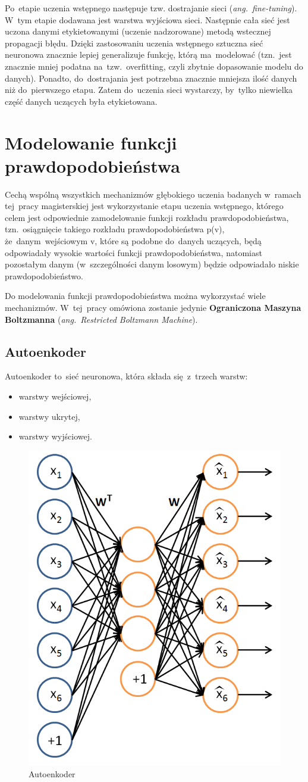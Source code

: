 Po~etapie uczenia wstępnego następuje tzw. dostrajanie sieci
(\textit{ang.~fine-tuning}). W~tym etapie dodawana jest warstwa wyjściowa sieci.
Następnie cała sieć jest uczona danymi etykietowanymi (uczenie nadzorowane)
metodą wstecznej propagacji błędu. Dzięki zastosowaniu uczenia wstępnego
sztuczna sieć neuronowa znacznie lepiej generalizuje funkcję, którą ma~modelować
(tzn.~jest znacznie mniej podatna na~tzw.~overfitting, czyli zbytnie dopasowanie modelu do danych).
Ponadto, do~dostrajania jest potrzebna znacznie mniejsza ilość danych niż do~pierwszego etapu. Zatem
do~uczenia sieci wystarczy, by~tylko niewielka część danych uczących była
etykietowana.

\section{Modelowanie funkcji prawdopodobieństwa}
Cechą wspólną wszystkich mechanizmów głębokiego uczenia badanych w~ramach tej~pracy magisterskiej jest
wykorzystanie etapu uczenia wstępnego, którego celem jest odpowiednie zamodelowanie
funkcji rozkładu prawdopodobieństwa, tzn.~osiągnięcie takiego rozkładu prawdopodobieństwa p(v),
że~danym~wejściowym v, które są podobne do~danych uczących, będą odpowiadały wysokie wartości
funkcji prawdopodobieństwa, natomiast pozostałym danym (w~szczególności danym losowym) będzie odpowiadało
niskie prawdopodobieństwo.

Do modelowania funkcji prawdopodobieństwa można wykorzystać wiele mechanizmów. W~tej~pracy omówiona zostanie
jedynie \textbf{Ograniczona Maszyna Boltzmanna} (\textit{ang.~Restricted Boltzmann Machine}).

\subsection{Autoenkoder}
Autoenkoder \cite{Autoencoder} to~sieć neuronowa, która składa się~z~trzech warstw:
\begin{itemize}
	\item warstwy wejściowej,
	\item warstwy ukrytej,
	\item warstwy wyjściowej.
\end{itemize}

\begin{figure}[H]
	\centering
	\includegraphics[width=0.5\linewidth]{img/autoencoder.png}
	\caption{Autoenkoder}
\end{figure}


